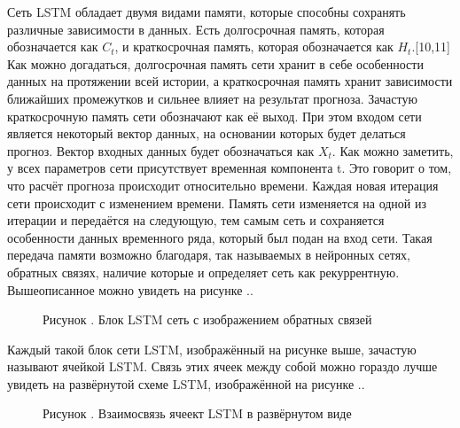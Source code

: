 \subtitlespace
  
{\gostFont

  \par \redline Сеть LSTM обладает двумя видами памяти, которые способны сохранять различные зависимости в данных. Есть долгосрочная память, которая обозначается как $ C_{t} $, и краткосрочная память, которая обозначается как $ H_{t} $.[10,11] Как можно догадаться, долгосрочная память сети хранит в себе особенности данных на протяжении всей истории, а краткосрочная память хранит зависимости ближайших промежутков и сильнее влияет на результат прогноза. Зачастую краткосрочную память сети обозначают как её выход. При этом входом сети является некоторый вектор данных, на основании которых будет делаться прогноз. Вектор входных данных будет обозначаться как $ X_{t} $. Как можно заметить, у всех параметров сети присутствует временная компонента t. Это говорит о том, что расчёт прогноза происходит относительно времени. Каждая новая итерация сети происходит с изменением времени. Память сети изменяется на одной из итерации и передаётся на следующую, тем самым сеть и сохраняется особенности данных временного ряда, который был подан на вход сети. Такая передача памяти возможно благодаря, так называемых в нейронных сетях, обратных связях, наличие которые и определяет сеть как рекуррентную. Вышеописанное можно увидеть на рисунке \thechaptercntr .\theimagecntr. 

  \begin{figure}[H]
    \centering
    \def\svgwidth{\textwidth}
    
    \caption*{\gostFont Рисунок \thechaptercntr .\theimagecntr \spc {--} Блок LSTM сеть с изображением обратных связей}
    \label{fig:LSTMBlackBox}
  \end{figure} \addtocounter{imagecntr}{1}

  \par \redline Каждый такой блок сети LSTM, изображённый на рисунке выше, зачастую называют ячейкой LSTM. Связь этих ячеек между собой можно гораздо лучше увидеть на развёрнутой схеме LSTM, изображённой на рисунке \thechaptercntr .\theimagecntr. 

  \begin{figure}[H]
    \centering
    \def\svgwidth{\textwidth}
    
    \caption*{\gostFont Рисунок \thechaptercntr .\theimagecntr \spc {--} Взаимосвязь ячеект LSTM в развёрнутом виде}
    \label{fig:LSTMSequence}
  \end{figure} \addtocounter{imagecntr}{1}

}
